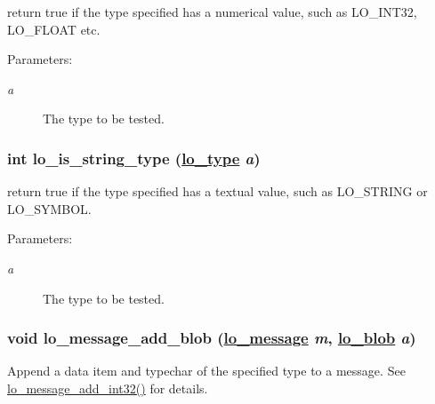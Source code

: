 return true if the type specified has a numerical value, such as LO\_\-INT32, LO\_\-FLOAT etc. 

\begin{Desc}
\item[Parameters:]
\begin{description}
\item[{\em a}]The type to be tested. \end{description}
\end{Desc}
\hypertarget{group__liblolowlevel_geb9f59d9f7bf8d50f21809e44889eee7}{
\subsubsection[lo\_\-is\_\-string\_\-type]{\setlength{\rightskip}{0pt plus 5cm}int lo\_\-is\_\-string\_\-type (\hyperlink{group__liblo_g11838c576b0197c255ce805fd7434736}{lo\_\-type} {\em a})}}
\label{group__liblolowlevel_geb9f59d9f7bf8d50f21809e44889eee7}


return true if the type specified has a textual value, such as LO\_\-STRING or LO\_\-SYMBOL. 

\begin{Desc}
\item[Parameters:]
\begin{description}
\item[{\em a}]The type to be tested. \end{description}
\end{Desc}
\hypertarget{group__liblolowlevel_gdd46df28da46be3f526151051410c935}{
\subsubsection[lo\_\-message\_\-add\_\-blob]{\setlength{\rightskip}{0pt plus 5cm}void lo\_\-message\_\-add\_\-blob (\hyperlink{lo__types_8h_d126083c98d941f00eb72d1690b38d63}{lo\_\-message} {\em m}, \hyperlink{lo__types_8h_8e780f8c09e3e4dd737fe249f11d16fc}{lo\_\-blob} {\em a})}}
\label{group__liblolowlevel_gdd46df28da46be3f526151051410c935}


Append a data item and typechar of the specified type to a message. See \hyperlink{group__liblolowlevel_g31ac1e4c0ec6c61f665ce3f9bbdc53c3}{lo\_\-message\_\-add\_\-int32()} for details. 

